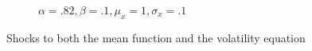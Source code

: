 \documentclass[11pt]{article}
\theoremstyle{definition}
\begin{document}
\begin{figure}[h!]
\begin{subfigure}{.5\textwidth}
      \caption{$\alpha = .82, \beta = .1, \mu_{x} = 1, \sigma_{x} = .1$}
      \label{fig:dual_shock_strong_alpha_inside}
    \end{subfigure}
    \caption{Shocks to both the mean function and the volatility equation}
    \label{fig:not_sure_what_write}
    \end{figure}

\end{document}
